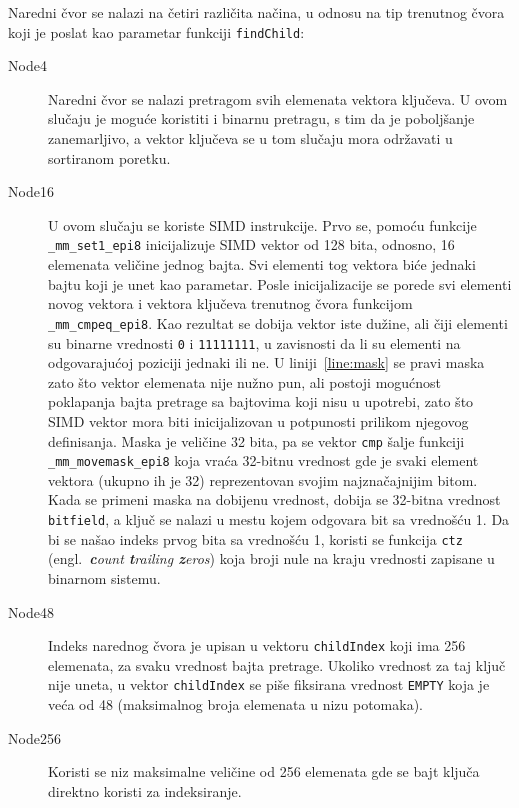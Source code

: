 \documentclass[12pt,oneside]{memoir}
\begin{document}
Naredni čvor se nalazi na četiri različita načina, u odnosu na
tip trenutnog čvora koji je poslat kao parametar funkciji
\texttt{findChild}:

\begin{description}
  \item[Node4] Naredni čvor se nalazi pretragom svih elemenata
        vektora ključeva. U ovom slučaju je moguće koristiti i binarnu
        pretragu, s tim da je poboljšanje zanemarljivo, a vektor ključeva se
        u tom slučaju mora održavati u sortiranom poretku.
  \item[Node16] U ovom slučaju se koriste SIMD instrukcije.
        Prvo se, pomoću funkcije \texttt{\_mm\_set1\_epi8} inicijalizuje
        SIMD vektor od 128 bita, odnosno, 16 elemenata veličine jednog bajta. Svi
        elementi tog vektora biće jednaki bajtu koji je unet kao parametar.
        Posle inicijalizacije se porede svi elementi novog vektora i
        vektora ključeva trenutnog čvora funkcijom
        \texttt{\_mm\_cmpeq\_epi8}. Kao rezultat se dobija vektor iste
        dužine, ali čiji elementi su binarne vrednosti \texttt{0}
        i \texttt{11111111}, u zavisnosti da li su elementi na odgovarajućoj
        poziciji jednaki ili ne. U liniji~\ref{line:mask} se pravi
        maska zato što vektor elemenata nije nužno pun, ali postoji
        mogućnost poklapanja bajta pretrage sa bajtovima koji nisu
        u upotrebi, zato što SIMD vektor mora biti inicijalizovan
        u potpunosti prilikom njegovog definisanja.
        Maska je veličine
        32 bita, pa se vektor \texttt{cmp} šalje funkciji
        \texttt{\_mm\_movemask\_epi8} koja vraća 32-bitnu vrednost
        gde je svaki element vektora (ukupno ih je 32) reprezentovan
        svojim najznačajnijim bitom. Kada se primeni maska na dobijenu
        vrednost, dobija se 32-bitna vrednost \texttt{bitfield},
        a ključ se nalazi u mestu kojem odgovara bit sa vrednošću
        1. Da bi se našao indeks prvog bita sa vrednošću 1, koristi
        se funkcija \texttt{ctz}
        (engl.\ \textit{\textbf{c}ount \textbf{t}railing \textbf{z}eros})
        koja broji nule na kraju vrednosti zapisane u binarnom
        sistemu.
  \item[Node48] Indeks narednog čvora je upisan u vektoru
        \texttt{childIndex} koji ima 256 elemenata, za svaku
        vrednost bajta pretrage. Ukoliko vrednost za
        taj ključ nije uneta,
        u vektor \texttt{childIndex} se piše fiksirana
        vrednost \texttt{EMPTY} koja je veća od 48 (maksimalnog
        broja elemenata u nizu potomaka).
  \item[Node256] Koristi se niz maksimalne veličine od 256 elemenata
        gde se bajt ključa direktno koristi za indeksiranje.
\end{description}
\end{document}
